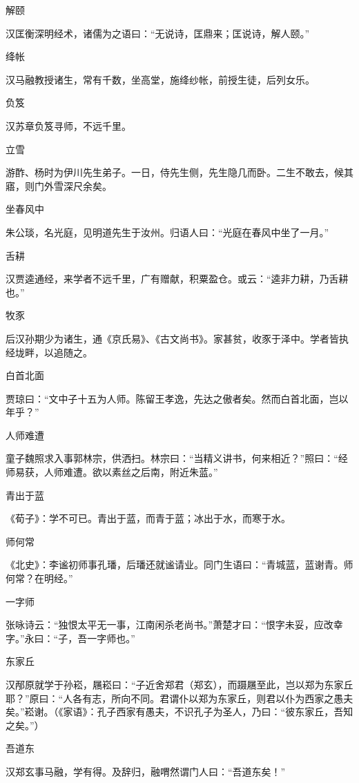 \documentclass[a4paper,12pt,UTF8,twoside]{ctexbook}
\begin{document}
    解颐
    
    汉匡衡深明经术，诸儒为之语曰：“无说诗，匡鼎来；匡说诗，解人颐。”
    
    绛帐
    
    汉马融教授诸生，常有千数，坐高堂，施绛纱帐，前授生徒，后列女乐。
    
    负笈
    
    汉苏章负笈寻师，不远千里。
    
    立雪
    
    游酢、杨时为伊川先生弟子。一日，侍先生侧，先生隐几而卧。二生不敢去，候其寤，则门外雪深尺余矣。
    
    坐春风中
    
    朱公琰，名光庭，见明道先生于汝州。归语人曰：“光庭在春风中坐了一月。”
    
    舌耕
    
    汉贾逵通经，来学者不远千里，广有赠献，积粟盈仓。或云：“逵非力耕，乃舌耕也。”
    
    牧豕
    
    后汉孙期少为诸生，通《京氏易》、《古文尚书》。家甚贫，收豕于泽中。学者皆执经垅畔，以追随之。
    
    白首北面
    
    贾琼曰：“文中子十五为人师。陈留王孝逸，先达之傲者矣。然而白首北面，岂以年乎？”
    
    人师难遭
    
    童子魏照求入事郭林宗，供洒扫。林宗曰：“当精义讲书，何来相近？”照曰：“经师易获，人师难遭。欲以素丝之后南，附近朱蓝。”
    
    青出于蓝
    
    《荀子》：学不可已。青出于蓝，而青于蓝；冰出于水，而寒于水。
    
    师何常
    
    《北史》：李谧初师事孔璠，后璠还就谧请业。同门生语曰：“青城蓝，蓝谢青。师何常？在明经。”
    
    一字师
    
    张咏诗云：“独恨太平无一事，江南闲杀老尚书。”萧楚才曰：“恨字未妥，应改幸字。”永曰：“子，吾一字师也。”
    
    东家丘
    
    汉邴原就学于孙崧，屩崧曰：“子近舍郑君（郑玄），而蹑屩至此，岂以郑为东家丘耶？”原曰：“人各有志，所向不同。君谓仆以郑为东家丘，则君以仆为西家之愚夫矣。”崧谢。（《家语》：孔子西家有愚夫，不识孔子为圣人，乃曰：“彼东家丘，吾知之矣。”）
    
    吾道东
    
    汉郑玄事马融，学有得。及辞归，融喟然谓门人曰：“吾道东矣！”
    
\end{document}
